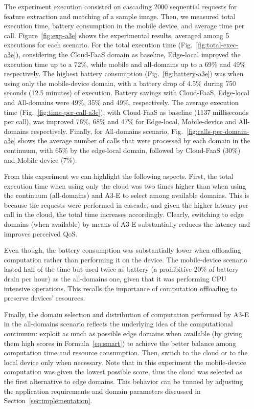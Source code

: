 
The experiment execution consisted on cascading 2000 sequential requests for feature extraction and matching of a sample image. Then, we measured total execution time, battery consumption in the mobile device, and average time per call. Figure~\ref{fig:exp-a3e} shows the experimental results, averaged among 5 executions for each scenario.
 For the total execution time (Fig.~\ref{fig:total-exec-a3e}), considering the Cloud-FaaS domain as baseline, Edge-local improved the execution time up to a 72\%, while mobile and all-domains up to a 69\%  and 49\% respectively. The highest battery consumption (Fig.~\ref{fig:battery-a3e}) was when using only the mobile-device domain, with a battery drop of 4.5\% during 750 seconds (12.5 minutes) of execution. Battery savings with Cloud-FaaS, Edge-local and All-domains were 49\%, 35\% and 49\%, respectively. The average execution time (Fig.~\ref{fig:time-per-call-a3e}), with Cloud-FaaS as baseline (1137 milliseconds per call), was improved 76\%, 68\% and 47\% for Edge-local, Mobile-device and All-domains respectively. Finally, for All-domains scenario, Fig.~\ref{fig:calls-per-domain-a3e} shows the average number of calls that were processed by each domain in the continuum, with 65\% by the edge-local domain, followed by Cloud-FaaS (30\%) and Mobile-device (7\%).
 
From this experiment we can highlight the following aspects. First, the total execution time when using only the cloud was two times higher than when using the continuum (all-domains) and A3-E to select among available domains. This is because the requests were performed in cascade, and given the higher latency per call in the cloud, the total time increases accordingly. Clearly, switching to edge domains (when available) by means of A3-E substantially reduces the latency and improves perceived QoS.

Even though, the battery consumption was substantially lower when offloading computation rather than performing it on the device. The mobile-device scenario lasted half of the time but used twice as battery (a prohibitive 20\% of battery drain per hour) as the all-domains one, given that it was performing CPU intensive operations. This recalls the importance of computation offloading to preserve devices' resources.

Finally, the domain selection and distribution of computation performed by A3-E in the all-domains scenario reflects the underlying idea of the computational continuum: exploit as much as possible edge domains when available (by giving them high scores in Formula~\ref{eq:smart}) to achieve the better balance among computation time and resource consumption. Then, switch to the cloud or to the local device only when necessary. Note that in this experiment the mobile-device computation was given the lowest possible score, thus the cloud was selected as the first alternative to edge domains. This behavior can be tunned by adjusting the application requirements and domain parameters discussed in Section~\ref{sec:implementation}.


